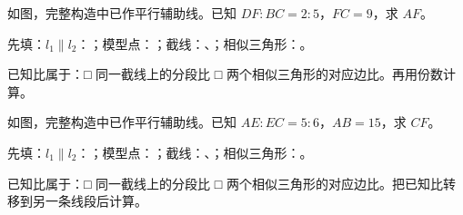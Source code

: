 \documentclass{exam-zh}
\newcounter{solstep}
\begin{document}
\begin{problem}[points=10]
  \noindent
  \begin{minipage}[t]{\dimexpr\linewidth-60mm-6mm\relax}
    \vspace{0pt}
    如图，完整构造中已作平行辅助线。已知 $DF:BC=2:5$，$FC=9$，求 $AF$。

先填：$l_1\parallel l_2$：\underline{\hspace{1.5cm}}；模型点：\underline{\hspace{0.8cm}}；截线：\underline{\hspace{1.3cm}}、\underline{\hspace{1.3cm}}；相似三角形：\underline{\hspace{3cm}}。

已知比属于：□ 同一截线上的分段比 \quad □ 两个相似三角形的对应边比。再用份数计算。


  \end{minipage}\hfill
  \begin{diagramcoltikz}{60mm}{第 2 题图}
  }
  \end{diagramcoltikz}
  \par\medskip
  \answerarea[34mm]
  \setcounter{solstep}{0}
  \begin{solutionblock}
  \end{solutionblock}
\end{problem}



\begin{problem}[points=10]
  \noindent
  \begin{minipage}[t]{\dimexpr\linewidth-60mm-6mm\relax}
    \vspace{0pt}
    如图，完整构造中已作平行辅助线。已知 $AE:EC=5:6$，$AB=15$，求 $CF$。

先填：$l_1\parallel l_2$：\underline{\hspace{1.5cm}}；模型点：\underline{\hspace{0.8cm}}；截线：\underline{\hspace{1.3cm}}、\underline{\hspace{1.3cm}}；相似三角形：\underline{\hspace{3cm}}。

已知比属于：□ 同一截线上的分段比 \quad □ 两个相似三角形的对应边比。把已知比转移到另一条线段后计算。


  \end{minipage}\hfill
  \begin{diagramcoltikz}{60mm}{第 3 题图}
  }
  \end{diagramcoltikz}
  \par\medskip
  \answerarea[34mm]
  \setcounter{solstep}{0}
  \begin{solutionblock}
  \end{solutionblock}
\end{problem}
\end{document}
